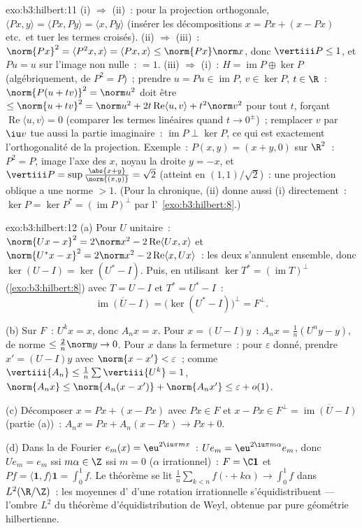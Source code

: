 \begin{solution}{exo:b3:hilbert:11}
(i) $\Rightarrow$ (ii)~: pour la projection orthogonale,
$\langle Px, y\rangle = \langle Px, Py\rangle = \langle x,
Py\rangle$ (insérer les décompositions $x = Px + (x - Px)$
etc.\ et tuer les termes croisés). (ii) $\Rightarrow$ (iii)~:
$\norm{Px}^2 = \langle P^2x, x\rangle = \langle Px, x\rangle
\leq \norm{Px}\norm x$, donc $\vertiii P \leq 1$, et $Pu = u$
sur l'image non nulle~: $= 1$. (iii) $\Rightarrow$ (i)~: $H =
\operatorname{im}P \oplus \ker P$ (algébriquement, de $P^2
= P$)~; prendre $u = Pu \in \operatorname{im}P$, $v \in \ker
P$, $t \in \R$~: $\norm{P(u + tv)}^2 = \norm u^2$ doit être
$\leq \norm{u + tv}^2 = \norm u^2 + 2t\operatorname{Re}\langle
u, v\rangle + t^2\norm v^2$ pour tout $t$, forçant
$\operatorname{Re}\langle u, v\rangle = 0$ (comparer les
termes linéaires quand $t \to 0^\pm$)~; remplacer $v$ par
$\iu v$ tue aussi la partie imaginaire~:
$\operatorname{im}P \perp \ker P$, ce qui est exactement
l'orthogonalité de la projection. Exemple~: $P(x, y) = (x +
y, 0)$ sur $\R^2$~: $P^2 = P$, image l'axe des $x$, noyau la
droite $y = -x$, et $\vertiii P =
\sup\frac{\abs{x+y}}{\norm{(x,y)}} = \sqrt2$ (atteint en
$(1,1)/\sqrt2$)~: une projection oblique a une norme $> 1$.
(Pour la chronique, (ii) donne aussi (i) directement~: $\ker P
= \ker P^* = (\operatorname{im}P)^\perp$ par
l'~\cref{exo:b3:hilbert:8}.)
\end{solution}

\begin{solution}{exo:b3:hilbert:12}
(a) Pour $U$ unitaire~: $\norm{Ux - x}^2 = 2\norm x^2 -
2\operatorname{Re}\langle Ux, x\rangle$ et $\norm{U^*x -
x}^2 = 2\norm x^2 - 2\operatorname{Re}\langle x, Ux\rangle$~:
les deux s'annulent ensemble, donc $\ker(U - I) = \ker(U^* -
I)$. Puis, en utilisant $\ker T^* = (\operatorname{im}T)^\perp$
(\cref{exo:b3:hilbert:8}) avec $T = U - I$ et $T^* = U^* -
I$~:
\[
\overline{\operatorname{im}(U - I)} = \bigl(\ker(U^* -
I)\bigr)^\perp = F^\perp .
\]

(b) Sur $F$~: $U^kx = x$, donc $A_nx = x$. Pour $x = (U -
I)y$~: $A_nx = \frac1n(U^ny - y)$, de norme $\leq
\frac2n\norm y \to 0$. Pour $x$ dans la fermeture~: pour
$\varepsilon$ donné, prendre $x' = (U - I)y$ avec $\norm{x -
x'} < \varepsilon$~; comme $\vertiii{A_n} \leq
\frac1n\sum\vertiii{U^k} = 1$, $\norm{A_nx} \leq
\norm{A_n(x - x')} + \norm{A_nx'} \leq \varepsilon + o(1)$.

(c) Décomposer $x = Px + (x - Px)$ avec $Px \in F$ et $x -
Px \in F^\perp = \overline{\operatorname{im}(U - I)}$
(partie (a))~: $A_nx = Px + A_n(x - Px) \to Px + 0$.

(d) Dans la  de Fourier $e_m(x) = \eu^{2\iu\pi mx}$~:
$Ue_m = \eu^{2\iu\pi m\alpha}e_m$, donc $Ue_m = e_m$ ssi
$m\alpha \in \Z$ ssi $m = 0$ ($\alpha$ irrationnel)~: $F =
\C\mathbf 1$ et $Pf = \langle\mathbf 1, f\rangle\mathbf 1 =
\int_0^1f$. Le théorème se lit $\frac1n\sum_{k<n}f(\cdot +
k\alpha) \to \int_0^1f$ dans $L^2(\R/\Z)$~: les moyennes
d' d'une rotation irrationnelle s'équidistribuent ---
l'ombre $L^2$ du théorème d'équidistribution de Weyl, obtenue
par pure géométrie hilbertienne.
\end{solution}

